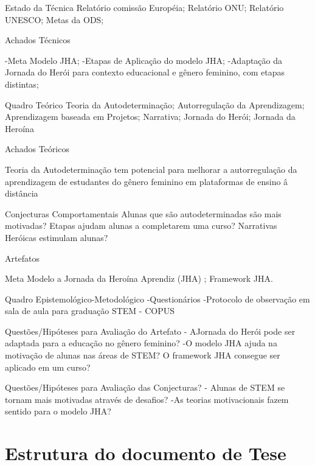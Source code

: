 Estado da Técnica
Relatório comissão Européia;
Relatório ONU;
Relatório UNESCO; 
Metas da ODS;

Achados Técnicos

-Meta Modelo JHA;
-Etapas de Aplicação do modelo JHA;
-Adaptação da Jornada do Herói para contexto educacional e gênero feminino, com etapas distintas;


Quadro Teórico
Teoria da Autodeterminação;
Autorregulação da Aprendizagem;
Aprendizagem baseada em Projetos;
Narrativa;
Jornada do Herói;
Jornada da Heroína

Achados Teóricos

Teoria da Autodeterminação tem potencial para melhorar a autorregulação da aprendizagem de estudantes do gênero feminino em plataformas de ensino â distância

Conjecturas Comportamentais
 Alunas que são autodeterminadas são mais motivadas?
Etapas ajudam alunas a completarem uma curso?
Narrativas Heróicas estimulam alunas?  

Artefatos 

Meta Modelo a Jornada da Heroína Aprendiz (JHA) ;
Framework JHA.

Quadro Epistemológico-Metodológico
-Questionários
-Protocolo de observação em sala de aula para graduação STEM - COPUS

Questões/Hipóteses para Avaliação do Artefato
- AJornada do Herói pode ser adaptada para a educação no gênero feminino?
-O modelo JHA ajuda na motivação de alunas nas áreas de STEM?
O framework JHA consegue ser aplicado em um curso?


Questões/Hipóteses para Avaliação das Conjecturas?
- Alunas de STEM se tornam mais motivadas através de desafios?
-As teorias motivacionais fazem sentido para o modelo JHA?

\section{Estrutura do documento de Tese}




